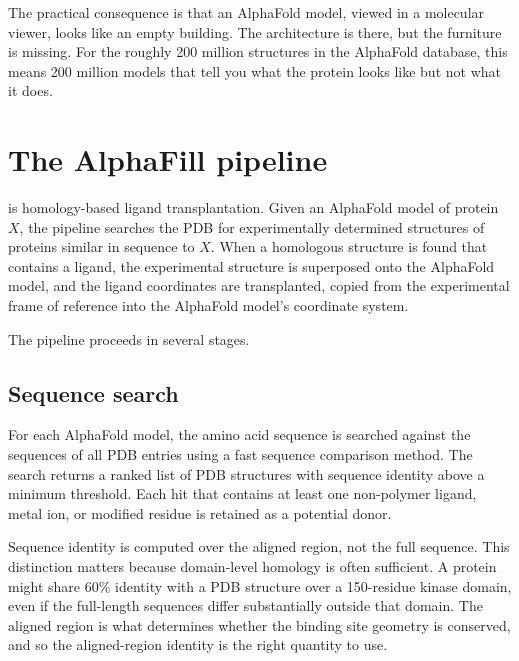 The practical consequence is that an AlphaFold model, viewed in a molecular viewer, looks like an empty building. The architecture is there, but the furniture is missing. For the roughly 200 million structures in the AlphaFold database, this means 200 million models that tell you what the protein looks like but not what it does.


\section{The AlphaFill pipeline}
\label{sec:alphafill-pipeline}

 is homology-based ligand transplantation. Given an AlphaFold model of protein $X$, the pipeline searches the PDB for experimentally determined structures of proteins similar in sequence to $X$. When a homologous structure is found that contains a ligand, the experimental structure is superposed onto the AlphaFold model, and the ligand coordinates are transplanted, copied from the experimental frame of reference into the AlphaFold model's coordinate system.

The pipeline proceeds in several stages.

\subsection{Sequence search}
\label{sec:sequence-search}

For each AlphaFold model, the amino acid sequence is searched against the sequences of all PDB entries using a fast sequence comparison method. The search returns a ranked list of PDB structures with sequence identity above a minimum threshold. Each hit that contains at least one non-polymer ligand, metal ion, or modified residue is retained as a potential donor.

Sequence identity is computed over the aligned region, not the full sequence. This distinction matters because domain-level homology is often sufficient. A protein might share 60\% identity with a PDB structure over a 150-residue kinase domain, even if the full-length sequences differ substantially outside that domain. The aligned region is what determines whether the binding site geometry is conserved, and so the aligned-region identity is the right quantity to use.

